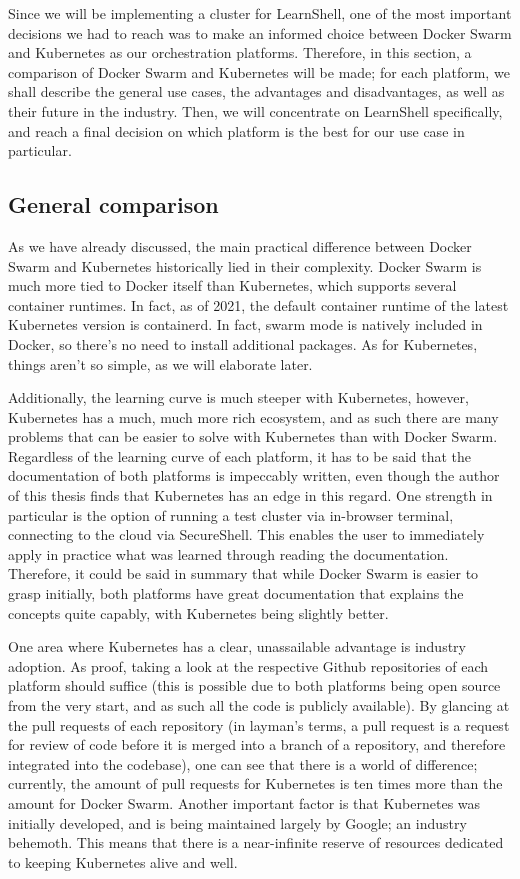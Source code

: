 \documentclass[thesis=B,english]{FITthesis}[2019/12/23]
\begin{document}
Since we will be implementing a cluster for LearnShell, one of the most important decisions we had to reach was to make an informed choice between Docker Swarm and Kubernetes as our orchestration platforms. Therefore, in this section, a comparison of Docker Swarm and Kubernetes will be made; for each platform, we shall describe the general use cases, the advantages and disadvantages, as well as their future in the industry. Then, we will concentrate on LearnShell specifically, and reach a final decision on which platform is the best for our use case in particular.

\subsection{General comparison}

As we have already discussed, the main practical difference between Docker Swarm and Kubernetes historically lied in their complexity. Docker Swarm is much more tied to Docker itself than Kubernetes, which supports several container runtimes. In fact, as of 2021, the default container runtime of the latest Kubernetes version is containerd. \cite{kube-containerd} In fact, swarm mode is natively included in Docker, so there's no need to install additional packages. As for Kubernetes, things aren't so simple, as we will elaborate later. 

Additionally, the learning curve is much steeper with Kubernetes, however, Kubernetes has a much, much more rich ecosystem, and as such there are many problems that can be easier to solve with Kubernetes than with Docker Swarm. Regardless of the learning curve of each platform, it has to be said that the documentation of both platforms is impeccably written, even though the author of this thesis finds that Kubernetes has an edge in this regard. One strength in particular is the option of running a test cluster via in-browser terminal, connecting to the cloud via SecureShell. This enables the user to immediately apply in practice what was learned through reading the documentation. Therefore, it could be said in summary that while Docker Swarm is easier to grasp initially, both platforms have great documentation that explains the concepts quite capably, with Kubernetes being slightly better.

One area where Kubernetes has a clear, unassailable advantage is industry adoption. As proof, taking a look at the respective Github repositories of each platform should suffice (this is possible due to both platforms being open source from the very start, and as such all the code is publicly available). By glancing at the pull requests of each repository (in layman's terms, a pull request is a request for review of code before it is merged into a branch of a repository, and therefore integrated into the codebase), one can see that there is a world of difference; currently, the amount of pull requests for Kubernetes is ten times more than the amount for Docker Swarm. \cite{swarm-pull, kube-pull} Another important factor is that Kubernetes was initially developed, and is being maintained largely by Google; an industry behemoth. This means that there is a near-infinite reserve of resources dedicated to keeping Kubernetes alive and well.
\end{document}
